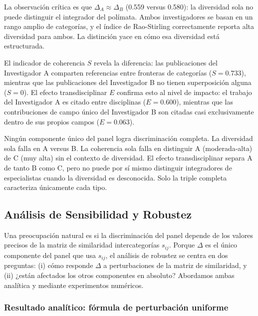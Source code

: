 \documentclass[
]{article}
\begin{document}
La observación crítica es que \(\Delta_A \approx \Delta_B\) (0.559
versus 0.580): la diversidad sola no puede distinguir el integrador del
polímata. Ambos investigadores se basan en un rango amplio de
categorías, y el índice de Rao-Stirling correctamente reporta alta
diversidad para ambos. La distinción yace en cómo esa diversidad está
estructurada.

El indicador de coherencia \(S\) revela la diferencia: las publicaciones
del Investigador A comparten referencias entre fronteras de categorías
(\(S = 0.733\)), mientras que las publicaciones del Investigador B no
tienen superposición alguna (\(S = 0\)). El efecto transdisciplinar
\(E\) confirma esto al nivel de impacto: el trabajo del Investigador A
es citado entre disciplinas (\(E = 0.600\)), mientras que las
contribuciones de campo único del Investigador B son citadas casi
exclusivamente dentro de sus propios campos (\(E = 0.063\)).

Ningún componente único del panel logra discriminación completa. La
diversidad sola falla en A versus B. La coherencia sola falla en
distinguir A (moderada-alta) de C (muy alta) sin el contexto de
diversidad. El efecto transdisciplinar separa A de tanto B como C, pero
no puede por sí mismo distinguir integradores de especialistas cuando la
diversidad es desconocida. Solo la triple completa caracteriza
únicamente cada tipo.

\hypertarget{anuxe1lisis-de-sensibilidad-y-robustez}{%
\subsection{Análisis de Sensibilidad y
Robustez}\label{anuxe1lisis-de-sensibilidad-y-robustez}}

Una preocupación natural es si la discriminación del panel depende de
los valores precisos de la matriz de similaridad intercategorías
\(s_{ij}\). Porque \(\Delta\) es el único componente del panel que usa
\(s_{ij}\), el análisis de robustez se centra en dos preguntas: (i) cómo
responde \(\Delta\) a perturbaciones de la matriz de similaridad, y (ii)
¿están afectados los otros componentes en absoluto? Abordamos ambas
analítica y mediante experimentos numéricos.

\hypertarget{resultado-analuxedtico-fuxf3rmula-de-perturbaciuxf3n-uniforme}{%
\subsubsection{Resultado analítico: fórmula de perturbación
uniforme}\label{resultado-analuxedtico-fuxf3rmula-de-perturbaciuxf3n-uniforme}}
\end{document}
